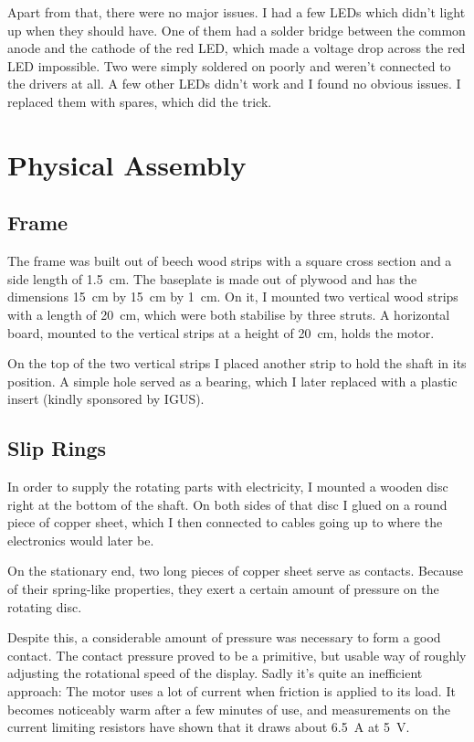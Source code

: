 \documentclass[a4paper, 11pt, titlepage]{report}
\begin{document}
Apart from that, there were no major issues. I had a few LEDs which didn't light up when they 
should have. One of them had a solder bridge between the common anode and the cathode of the red
LED, which made a voltage drop across the red LED impossible. Two were simply soldered on poorly
and weren't connected to the drivers at all. A few other LEDs didn't work and I found no obvious
issues. I replaced them with spares, which did the trick.


\section{Physical Assembly}


\subsection{Frame}

The frame was built out of beech wood strips with a square cross section and a side length of 
\SI{1.5}{\centi\meter}. The baseplate is made out of plywood and has the dimensions 
\SI{15}{\centi\meter} by \SI{15}{\centi\meter} by \SI{1}{\centi\meter}. On it, I mounted two 
vertical wood strips with a length of \SI{20}{\centi\meter}, which were both stabilise by three
struts. A horizontal board, mounted to the vertical strips at a height of \SI{20}{\centi\meter}, 
holds the motor.

On the top of the two vertical strips I placed another strip to hold the shaft in its position. 
A simple hole served as a bearing, which I later replaced with a plastic insert (kindly sponsored
by IGUS). 


\subsection{Slip Rings}

In order to supply the rotating parts with electricity, I mounted a wooden disc right at the bottom
of the shaft. On both sides of that disc I glued on a round piece of copper sheet, which I then
connected to cables going up to where the electronics would later be.

On the stationary end, two long pieces of copper sheet serve as contacts. Because of their 
spring-like properties, they exert a certain amount of pressure on the rotating disc. 

Despite this, a considerable amount of pressure was necessary to form a good contact. The contact
pressure proved to be a primitive, but usable way of roughly adjusting the rotational speed of
the display. Sadly it's quite an inefficient approach: The motor uses a lot of current when 
friction is applied to its load. It becomes noticeably warm after a few minutes of use, and 
measurements on the current limiting resistors have shown that it draws about \SI{6.5}{\ampere} at
\SI{5}{\volt}.
\end{document}
